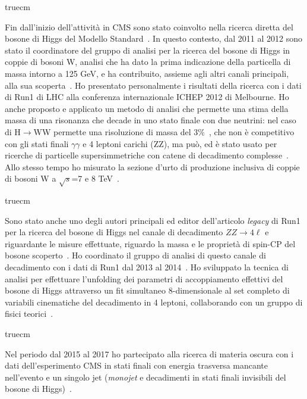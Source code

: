 \documentclass[11pt,twoside,a4paper]{article}
\begin{document}
 truecm

Fin dall'inizio dell'attivit\`a in CMS sono stato coinvolto nella
ricerca diretta del bosone di Higgs del Modello
Standard~\cite{Chatrchyan:2011tz,Chatrchyan:2012tx,Chatrchyan:2012ty}. In
questo contesto, dal 2011 al 2012 sono stato il coordinatore del
gruppo di analisi per la ricerca del bosone di Higgs in coppie di
bosoni W, analisi che ha dato la prima indicazione della particella di
massa intorno a 125 GeV, e ha contribuito, assieme agli altri canali
principali, alla sua
scoperta~\cite{Chatrchyan:2012ufa,Chatrchyan:2013lba}. Ho presentato
personalmente i risultati della ricerca con i dati di Run1 di LHC alla
conferenza internazionale ICHEP 2012 di Melbourne. Ho anche proposto e
applicato un metodo di analisi che permette una stima della massa di
una risonanza che decade in uno stato finale con due neutrini: nel
caso di H$\to$WW permette una risoluzione di massa del
3\%~\cite{Chatrchyan:2013iaa}, che non \`e competitivo con gli stati
finali $\gamma\gamma$ e 4 leptoni carichi (ZZ), ma pu\`o, ed \`e stato
usato per ricerche di particelle supersimmetriche con catene di
decadimento complesse~\cite{Khachatryan:2016epu}. Allo stesso tempo ho
misurato la sezione d'urto di produzione inclusiva di coppie di bosoni
W a $\sqrt{s}$=7 e 8 TeV~\cite{Chatrchyan:2013yaa}.

 truecm

Sono stato anche uno degli autori principali ed editor dell'articolo
\textit{legacy} di Run1 per la ricerca del bosone di Higgs nel canale
di decadimento $ZZ\to4\ell$ e riguardante le misure effettuate,
riguardo la massa e le propriet\`a di spin-CP del bosone
scoperto~\cite{Chatrchyan:2013mxa}. Ho coordinato il gruppo di analisi
di questo canale di decadimento con i dati di Run1 dal 2013 al
2014~\cite{Khachatryan:2014kca}. Ho sviluppato la tecnica di analisi
per effettuare l'unfolding dei parametri di accoppiamento effettivi
del bosone di Higgs attraverso un fit simultaneo 8-dimensionale al set
completo di variabili cinematiche del decadimento in 4 leptoni,
collaborando con un gruppo di fisici teorici~\cite{Chen:2014pia}.

 truecm

Nel periodo dal 2015 al 2017 ho partecipato alla ricerca di materia
oscura con i dati dell'esperimento CMS in stati finali con energia
trasversa mancante nell'evento e un singolo jet (\textit{monojet} e
decadimenti in stati finali invisibili del bosone di
Higgs)~\cite{Sirunyan:2017hci,Sirunyan:2017jix}.
\end{document}
